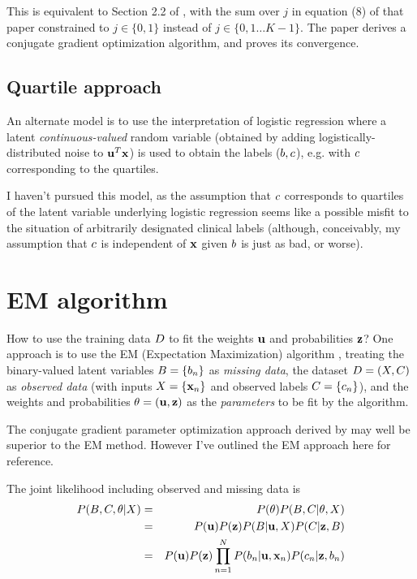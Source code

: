 \documentclass{article}
\begin{document}
This is equivalent to Section 2.2 of \cite{BootkrajangKaban2012},
with the sum over $j$ in equation (8) of that paper constrained to $j\in\{0,1\}$
instead of $j\in\{0,1\ldots K-1\}$.
The paper derives a conjugate gradient optimization algorithm,
and proves its convergence.

\subsection{Quartile approach}

An alternate model is to use the interpretation of logistic regression where a latent {\em continuous-valued} random variable
(obtained by adding logistically-distributed noise to ${\bf u}^T {\bf x}$)
is used to obtain the labels ($b,c$),
e.g. with $c$ corresponding to the quartiles.

I haven't pursued this model, as the assumption that $c$ corresponds to quartiles of the latent variable underlying
logistic regression seems like a possible misfit to the situation of arbitrarily designated clinical labels
(although, conceivably, my assumption that $c$ is independent of ${\bf x}$ given $b$ is just as bad, or worse).


\section{EM algorithm}

How to use the training data $D$ to fit the weights ${\bf u}$ and probabilities ${\bf z}$?
One approach is to use the EM (Expectation Maximization) algorithm \cite{DempsterLairdRubin77},
treating the binary-valued latent variables $B = \{ b_n \}$ as {\em missing data},
the dataset $D = (X,C)$ as {\em observed data}
(with inputs $X = \{ {\bf x}_n \}$ and observed labels $C = \{ c_n \}$),
and the weights and probabilities $\theta = ({\bf u},{\bf z})$ as the {\em parameters} to be fit by the algorithm.

The conjugate gradient parameter optimization approach
derived by \cite{BootkrajangKaban2012} may well be superior to the EM method.
However I've outlined the EM approach here for reference.

The joint likelihood including observed and missing data is
\begin{eqnarray*}
  P(B,C,\theta|X)
  & = & P(\theta) P(B,C|\theta,X) \\
  & = & P({\bf u}) P({\bf z}) P(B|{\bf u},X) P(C|{\bf z},B) \\
  & = & P({\bf u}) P({\bf z}) \prod_{n=1}^{N} P(b_{n}|{\bf u},{\bf x}_{n}) P(c_{n}|{\bf z},b_{n})
\end{eqnarray*}
\end{document}

